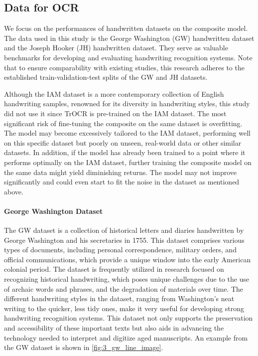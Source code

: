 \subsection{Data for OCR} 
\label{subsec:3_data_for_ocr}
We focus on the performances of handwritten datasets on the composite model. The data used in this study is the George Washington (GW) handwritten dataset and the Joseph Hooker (JH) handwritten dataset. They serve as valuable benchmarks for developing and evaluating handwriting recognition systems. Note that to ensure comparability with existing studies, this research adheres to the established train-validation-test splits of the GW and JH datasets.

Although the IAM dataset is a more contemporary collection of English handwriting samples, renowned for its diversity in handwriting styles, this study did not use it since TrOCR is pre-trained on the IAM dataset. The most significant risk of fine-tuning the composite on the same dataset is overfitting. The model may become excessively tailored to the IAM dataset, performing well on this specific dataset but poorly on unseen, real-world data or other similar datasets. In addition, if the model has already been trained to a point where it performs optimally on the IAM dataset, further training the composite model on the same data might yield diminishing returns. The model may not improve significantly and could even start to fit the noise in the dataset as mentioned above.

\paragraph*{George Washington Dataset}
\label{par:3_george_washington_dataset}
The GW dataset is a collection of historical letters and diaries handwritten by George Washington and his secretaries in 1755. This dataset comprises various types of documents, including personal correspondence, military orders, and official communications, which provide a unique window into the early American colonial period. The dataset is frequently utilized in research focused on recognizing historical handwriting, which poses unique challenges due to the use of archaic words and phrases, and the degradation of materials over time. The different handwriting styles in the dataset, ranging from Washington's neat writing to the quicker, less tidy ones, make it very useful for developing strong handwriting recognition systems. This dataset not only supports the preservation and accessibility of these important texts but also aids in advancing the technology needed to interpret and digitize aged manuscripts. An example from the GW dataset is shown in \autoref{fig:3_gw_line_image}.

